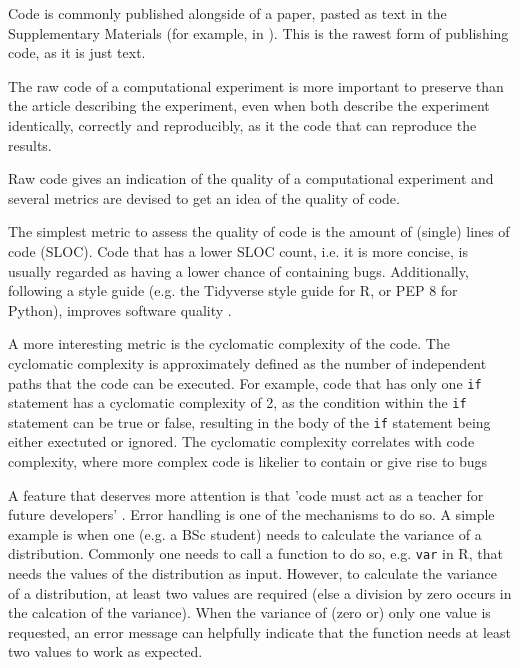 Code is commonly published alongside of a 
paper, pasted as text in the Supplementary Materials 
(for example, in \cite{labrecque2019interpretation}).
This is the rawest form of publishing code,
as it is just text.


The raw code of a computational experiment is
more important to preserve than the article describing
the experiment, even when both describe the experiment identically,
correctly and reproducibly, 
as it the code that can reproduce the results.


Raw code gives an indication of the quality 
of a computational experiment and several metrics are
devised to get an idea of the quality of code.

The simplest metric to assess the quality of code is 
the amount of (single) lines of code (SLOC). 
Code that has a lower SLOC count, i.e. it is more concise,
is usually regarded as having a lower chance of containing bugs.
Additionally, following a style guide 
(e.g. the Tidyverse style guide \cite{wickham2019advanced} for R,
or PEP 8 \cite{van2001pep} for Python), 
improves software quality \cite{fang2001}.

A more interesting metric is the cyclomatic complexity of the code.
The cyclomatic complexity is approximately defined 
as the number of independent paths that
the code can be executed. 
For example, code that has only one \verb|if| statement
has a cyclomatic complexity of 2, as the condition within the \verb|if|
statement can be true or false,
resulting in the body of the \verb|if| statement being either
exectuted or ignored.
The cyclomatic complexity correlates with code complexity,
where more complex code is likelier to contain or give rise to bugs 
\cite{abd2018calculating,chen2019empirical,zimmermann2008predicting}

A feature that deserves more attention
is that 'code must act as a teacher for future developers' \cite{sadowski2018modern}.
Error handling is one of the mechanisms to do so.
A simple example is when one (e.g. a BSc student) 
needs to calculate the variance of a distribution.
Commonly one needs to call a function to do so, 
e.g. \verb|var| in R, that needs the values of the distribution
as input.
However, to calculate the variance of a distribution, at least two values
are required (else a division by zero occurs in the calcation of the variance). 
When the variance of (zero or) only one value is requested,
an error message can helpfully indicate that the function 
needs at least two values to work as expected.

